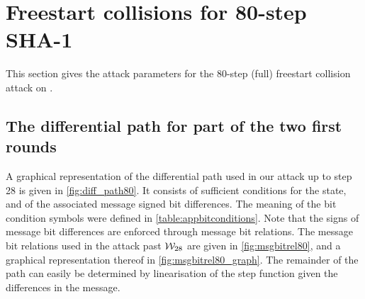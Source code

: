 \section{Freestart collisions for 80-step SHA-1}
\label{sec:res_80}

This section gives the attack parameters for the 80-step (full) freestart collision attack on \shaone.

\subsection{The differential path for part of the two first rounds}
\label{sec:app_diff_path80}

A graphical representation of the differential path
used in our attack up to step 28 is given in \autoref{fig:diff_path80}.
It consists of sufficient conditions for the state, and of the associated message signed bit differences.
The meaning of the bit condition symbols were defined in \autoref{table:appbitconditions}.
Note that the signs of message bit differences are enforced through message bit relations.
The message bit relations
used in the attack past $\mathcal{W}_{28}$ are given in \autoref{fig:msgbitrel80}, and a graphical
representation thereof in
\autoref{fig:msgbitrel80_graph}.
The remainder of the path can easily be determined by linearisation of the step function given the differences
in the message.

